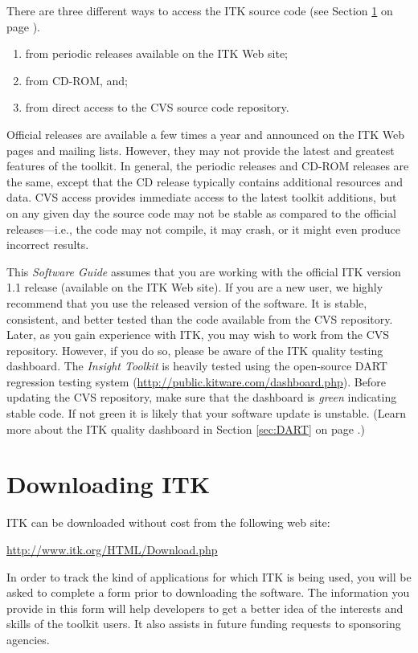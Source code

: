 There are three different ways to access the ITK source code
(see Section \ref{sec:DownloadingITK} on page \pageref{sec:DownloadingITK}).
\begin{enumerate}
	\item	from periodic releases available on the ITK Web site;
	\item	from CD-ROM, and;
	\item	from direct access to the CVS source code repository.
\end{enumerate}
Official releases are available a few times a year and announced on the ITK
Web pages and mailing lists. However, they may not provide the latest and
greatest features of the toolkit. In general, the periodic releases and
CD-ROM releases are the same, except that the CD release typically contains
additional resources and data. CVS access provides immediate access to the
latest toolkit additions, but on any given day the source code may not be
stable as compared to the official releases---i.e., the code may not compile,
it may crash, or it might even produce incorrect results.

This \emph{Software Guide} assumes that you are working with the official ITK
version 1.1 release (available on the ITK Web site). If you are a new user,
we highly recommend that you use the released version of the software. It is
stable, consistent, and better tested than the code available from the CVS
repository. Later, as you gain experience with ITK, you may wish to work from
the CVS repository. However, if you do so, please be aware of the ITK quality
testing dashboard. The \emph{Insight Toolkit} is heavily tested using the
open-source DART regression testing system
(\url{http://public.kitware.com/dashboard.php}). Before updating the CVS
repository, make sure that the dashboard is \emph{green} indicating stable
code. If not green it is likely that your software update is unstable. (Learn
more about the ITK quality dashboard in Section
\ref{sec:DART} on page \pageref{sec:DART}.)

\section{Downloading ITK}
\label{sec:DownloadingITK}
 

ITK can be downloaded without cost from the following web site:
\begin{center} 
  \url{http://www.itk.org/HTML/Download.php}
\end{center}
In order to track the kind of applications for which ITK is being used, you
will be asked to complete a form prior to downloading the software.
The information you provide in this form will help developers to get a better
idea of the interests and skills of the toolkit users. It also assists in 
future funding requests to sponsoring agencies.


